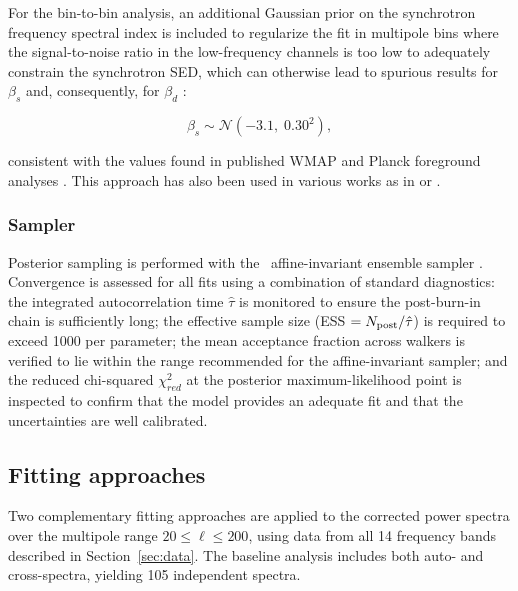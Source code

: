 For the bin-to-bin analysis, an additional Gaussian prior on the synchrotron frequency spectral index is included to regularize the fit in multipole bins where the signal-to-noise ratio in the low-frequency channels is too low to adequately constrain the synchrotron SED, which can otherwise lead to spurious results for $\beta_s$ and, consequently, for $\beta_d$ \citep{Planck_2018XI}:

\begin{equation}
\beta_s \sim \mathcal{N}(-3.1,\; 0.30^2),
\end{equation}

consistent with the values found in published WMAP and Planck foreground analyses \citep{WMAP_7yr_foregrounds, Planck_2016XXX}. This approach has also been used in various works as in \cite{Planck_2018XI} or \cite{Choi_2015}.

\subsubsection{Sampler}
\label{sec:sampler}

Posterior sampling is performed with the \emcee\ affine-invariant ensemble sampler \citep{Emcee}. Convergence is assessed for all fits using a combination of standard diagnostics: the integrated autocorrelation time $\hat{\tau}$ is monitored to ensure the post-burn-in chain is sufficiently long; the effective sample size (ESS $= N_{\rm post}/\hat{\tau}$) is required to exceed 1000 per parameter; the mean acceptance fraction across walkers is verified to lie within the range recommended for the affine-invariant sampler; and the reduced chi-squared $\chi_{red}^2$ at the posterior maximum-likelihood point is inspected to confirm that the model provides an adequate fit and that the uncertainties are well calibrated.


\subsection{Fitting approaches}
\label{sec:fitting_methods}

Two complementary fitting approaches are applied to the corrected power spectra over the multipole range $20 \leq \ell \leq 200$, using data from all 14 frequency bands described in Section~\ref{sec:data}. The baseline analysis includes both auto- and cross-spectra, yielding 105 independent spectra. 

